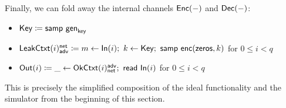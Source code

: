 \noindent Finally, we can fold away the internal channels $\mathsf{Enc}(-)$ and $\mathsf{Dec}(-)$:

\begin{itemize}
\item $\mathsf{Key} \coloneqq \mathsf{samp} \ \mathsf{gen}_{\mathsf{key}}$
\item $\mathsf{LeakCtxt}(i)^{\mathsf{net}}_{\mathsf{adv}} \coloneqq m \leftarrow \mathsf{In}(i); \ k \leftarrow \mathsf{Key}; \ \mathsf{samp} \ \mathsf{enc}(\mathsf{zeros},k)$ for $0 \leq i < q$
\item $\mathsf{Out}(i) \coloneqq \_ \leftarrow \mathsf{OkCtxt}(i)^{\mathsf{adv}}_{\mathsf{net}}; \ \mathsf{read} \ \mathsf{In}(i)$ for $0 \leq i < q$
\end{itemize}

\noindent This is precisely the simplified composition of the ideal functionality and the simulator from the beginning of this section.